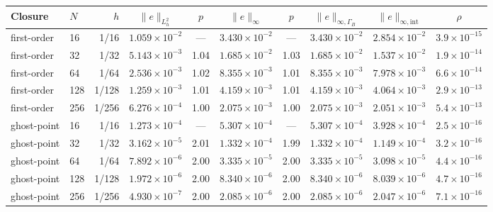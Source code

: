 \begin{tabular}{@{}llrccccccc@{}}\toprule
Closure & $N$ & $h$ & $\|e\|_{L^2_h}$ & $p$ & $\|e\|_{\infty}$ & $p$ & $\|e\|_{\infty,\Gamma_B}$ & $\|e\|_{\infty,\mathrm{int}}$ & $\rho$\\\midrule
first-order & 16 & 1/16 & $1.059\times10^{-2}$ & --- & $3.430\times10^{-2}$ & --- & $3.430\times10^{-2}$ & $2.854\times10^{-2}$ & $3.9\times10^{-15}$\\
first-order & 32 & 1/32 & $5.143\times10^{-3}$ & 1.04 & $1.685\times10^{-2}$ & 1.03 & $1.685\times10^{-2}$ & $1.537\times10^{-2}$ & $1.9\times10^{-14}$\\
first-order & 64 & 1/64 & $2.536\times10^{-3}$ & 1.02 & $8.355\times10^{-3}$ & 1.01 & $8.355\times10^{-3}$ & $7.978\times10^{-3}$ & $6.6\times10^{-14}$\\
first-order & 128 & 1/128 & $1.259\times10^{-3}$ & 1.01 & $4.159\times10^{-3}$ & 1.01 & $4.159\times10^{-3}$ & $4.064\times10^{-3}$ & $2.9\times10^{-13}$\\
first-order & 256 & 1/256 & $6.276\times10^{-4}$ & 1.00 & $2.075\times10^{-3}$ & 1.00 & $2.075\times10^{-3}$ & $2.051\times10^{-3}$ & $5.4\times10^{-13}$\\
\midrule
ghost-point & 16 & 1/16 & $1.273\times10^{-4}$ & --- & $5.307\times10^{-4}$ & --- & $5.307\times10^{-4}$ & $3.928\times10^{-4}$ & $2.5\times10^{-16}$\\
ghost-point & 32 & 1/32 & $3.162\times10^{-5}$ & 2.01 & $1.332\times10^{-4}$ & 1.99 & $1.332\times10^{-4}$ & $1.149\times10^{-4}$ & $3.2\times10^{-16}$\\
ghost-point & 64 & 1/64 & $7.892\times10^{-6}$ & 2.00 & $3.335\times10^{-5}$ & 2.00 & $3.335\times10^{-5}$ & $3.098\times10^{-5}$ & $4.4\times10^{-16}$\\
ghost-point & 128 & 1/128 & $1.972\times10^{-6}$ & 2.00 & $8.340\times10^{-6}$ & 2.00 & $8.340\times10^{-6}$ & $8.039\times10^{-6}$ & $4.7\times10^{-16}$\\
ghost-point & 256 & 1/256 & $4.930\times10^{-7}$ & 2.00 & $2.085\times10^{-6}$ & 2.00 & $2.085\times10^{-6}$ & $2.047\times10^{-6}$ & $7.1\times10^{-16}$\\
\bottomrule
\end{tabular}